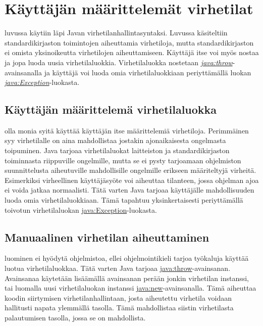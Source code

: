 \documentclass{tufte-book}
\newcommand{\java}[1]{\underline{\gls{java:#1}}}
\newcommand{\newjava}[1]{\textit{\java{#1}}}
\begin{document}

\section{Käyttäjän määrittelemät virhetilat}
\label{exception}

 luvussa  käytiin läpi Javan
virhetilanhallintasyntaksi. Luvussa käsiteltiin standardikirjaston toimintojen aiheuttamia
virhetiloja, mutta standardikirjaston ei omista yksinoikeutta virhetilojen aiheuttamiseen.
Käyttäjä itse voi myös nostaa ja jopa luoda uusia virhetilaluokkia. Virhetilaluokka nostetaan
\newjava{throw}-avainsanalla ja käyttäjä voi luoda omia virhetilaluokkiaan periyttämällä luokan
\newjava{Exception}-luokasta.

\subsection{Käyttäjän määrittelemä virhetilaluokka}
\label{exception}

 olla monia syitä käyttää käyttäjän itse määrittelemiä virhetiloja.
Perimmäinen syy virhetilalle on aina mahdollistaa jostakin ajonaikaisesta ongelmasta toipuminen.
Java tarjoaa virhetilaluokat laitteiston ja standardikirjaston toiminnasta riippuville ongelmille,
mutta se ei pysty tarjoamaan ohjelmiston suunnittelusta aiheutuville mahdollisille ongelmille
erikseen määriteltyjä virheitä. Esimerkiksi virheellinen käyttäjäsyöte voi aiheuttaa tilanteen,
jossa ohjelman ajoa ei voida jatkaa normaalisti. Tätä varten Java tarjoaa käyttäjälle
mahdollisuuden luoda omia virhetilaluokkiaan. Tämä tapahtuu yksinkertaisesti periyttämällä
toivotun virhetilaluokan \java{Exception}-luokasta.

\subsection{Manuaalinen virhetilan aiheuttaminen}
\label{throws}

 luominen ei hyödytä ohjelmistoa, ellei ohjelmointikieli tarjoa
työkaluja käyttää luotua virhetilaluokkaa. Tätä varten Java tarjoaa \java{throw}-avainsanan.
Avainsanaa käytetään lisäämällä avainsanan perään jonkin virhetilan instanssi, tai luomalla uusi
virhetilaluokan instanssi \java{new}-avainsanalla. Tämä aiheuttaa koodin siirtymisen
virhetilanhallintaan, josta aiheutettu virhetila voidaan hallitusti napata ylemmällä tasolla. Tämä
mahdollistaa siistin virhetilasta palautumisen tasolla, jossa se on mahdollista. 
\end{document}
